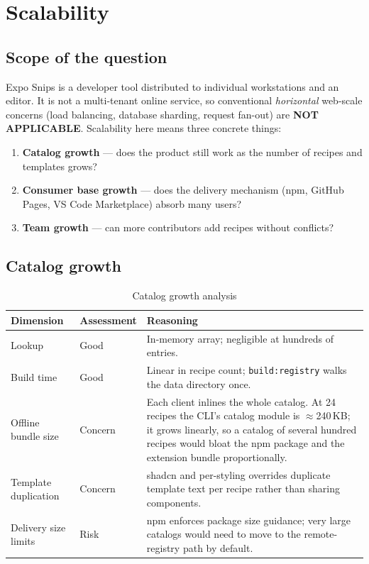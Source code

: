 \chapter{Scalability}
\label{ch:scalability}

\section{Scope of the question}

Expo Snips is a developer tool distributed to individual workstations and an
editor. It is not a multi-tenant online service, so conventional
\emph{horizontal} web-scale concerns (load balancing, database sharding, request
fan-out) are \textbf{NOT APPLICABLE}. Scalability here means three concrete
things:

\begin{enumerate}
  \item \textbf{Catalog growth} --- does the product still work as the number of
        recipes and templates grows?
  \item \textbf{Consumer base growth} --- does the delivery mechanism (npm,
        GitHub Pages, VS Code Marketplace) absorb many users?
  \item \textbf{Team growth} --- can more contributors add recipes without
        conflicts?
\end{enumerate}

\section{Catalog growth}

\begin{longtable}{p{3.8cm}p{1.9cm}p{8.5cm}}
\caption{Catalog growth analysis}\\
\toprule
\textbf{Dimension} & \textbf{Assessment} & \textbf{Reasoning} \\
\midrule

Lookup & Good & In-memory array; negligible at hundreds of entries. \\
Build time & Good & Linear in recipe count; \texttt{build:registry} walks the
data directory once. \\
Offline bundle size & Concern & Each client inlines the whole catalog. At 24
recipes the CLI's catalog module is $\approx$240\,KB; it grows linearly, so a
catalog of several hundred recipes would bloat the npm package and the extension
bundle proportionally. \\
Template duplication & Concern & shadcn and per-styling overrides duplicate
template text per recipe rather than sharing components. \\
Delivery size limits & Risk & npm enforces package size guidance; very large
catalogs would need to move to the remote-registry path by default. \\
\bottomrule
\end{longtable}

